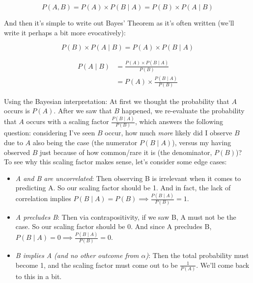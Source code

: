 \documentclass[letterpaper,12pt]{report}
\providecommand{\tightlist}{%
  \setlength{\itemsep}{0pt}\setlength{\parskip}{0pt}}
\begin{document}
\[ P(A,B) = P(A) \times P(B \mid A) = P(B) \times P(A \mid B) \]

And then it's simple to write out Bayes' Theorem as it's often written
(we'll write it perhaps a bit more evocatively):

\[ P(B) \times P(A \mid B) = P(A) \times P(B \mid A) \]

\[\begin{split} P(A \mid B) &= \frac{P(A) \times P(B \mid A)} {P(B)} \\
                        &= P(A) \times \frac {P(B \mid A)} {P(B)} \end{split}\]

Using the Bayesian interpretation: At first we thought the probability
that \(A\) occurs is \(P(A)\). After we saw that \(B\) happened, we
re-evaluate the probability that \(A\) occurs with a scaling factor \(
\frac {P(B \mid A)} {P(B)} \), which answers the following question: considering I've
seen \(B\) occur, how much \emph{more} likely did I observe \(B\) due to
\(A\) also being the case (the numerator \(P(B \mid A)\)), versus my having observed
\(B\) just because of how common/rare it is (the denominator, \(P(B)\))? To see
why this scaling factor makes sense, let's consider some edge cases:

\begin{itemize}
  \tightlist
  \item 
    \emph{A and B are uncorrelated}: Then observing B is irrelevant when it comes
    to predicting A. So our scaling factor should be 1. And in fact, the lack of 
    correlation implies \(P(B \mid A) = P(B) \implies \frac {P(B \mid A)} {P(B)} = 1\).
  \item
    \emph{A precludes B}: Then via contrapositivity, if we saw B, A must not be the case.
    So our scaling factor should be 0. And since A precludes B,
    \(P(B \mid A) = 0 \implies \frac {P(B \mid A)} {P(B)} = 0\).
  \item
    \emph{B implies A (and no other outcome from \(\alpha\))}:
    Then the total probability
    must become 1, and the scaling factor must come out to be \(\frac {1} {P(A)}\).
    We'll come back to this in a bit.
\end{itemize}
\end{document}
